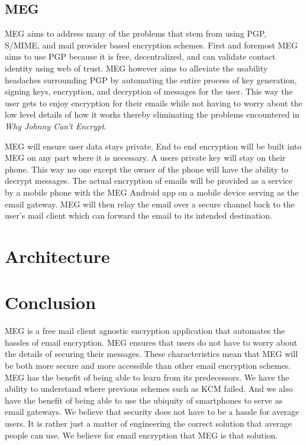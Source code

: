 \documentclass[10pt,twocolumn]{article}
\begin{document}
\subsection{MEG}
\par MEG aims to address many of the problems that stem from using PGP, S/MIME, and mail provider based encryption schemes. First and foremost MEG aims to use PGP because it is free, decentralized, and can validate contact identity using web of trust. MEG however aims to alleviate the usability headaches surrounding PGP by automating the entire process of key generation, signing keys, encryption, and decryption of messages for the user. This way the user gets to enjoy encryption for their emails while not having to worry about the low level details of how it works thereby eliminating the problems encountered in \textit{Why Johnny Can't Encrypt}\cite{whitten1999johnny}.
\par MEG will ensure user data stays private. End to end encryption will be built into MEG on any part where it is necessary. A users private key will stay on their phone. This way no one except the owner of the phone will have the ability to decrypt messages. The actual encryption of emails will be provided as a service by a mobile phone with the MEG Android app on a mobile device serving as the email gateway. MEG will then relay the email over a secure channel back to the user's mail client which can forward the email to its intended destination.

\section{Architecture}

\section{Conclusion}
\par MEG is a free mail client agnostic encryption application that automates the hassles of email encryption. MEG ensures that users do not have to worry about the details of securing their messages. These characteristics mean that MEG will be both more secure and more accessible than other email encryption schemes. MEG has the benefit of being able to learn from its predecessors. We have the ability to understand where previous schemes such as KCM failed. And we also have the benefit of being able to use the ubiquity of smartphones to serve as email gateways. We believe that security does not have to be a hassle for average users. It is rather just a matter of engineering the correct solution that average people can use. We believe for email encryption that MEG is that solution.


\end{document}
